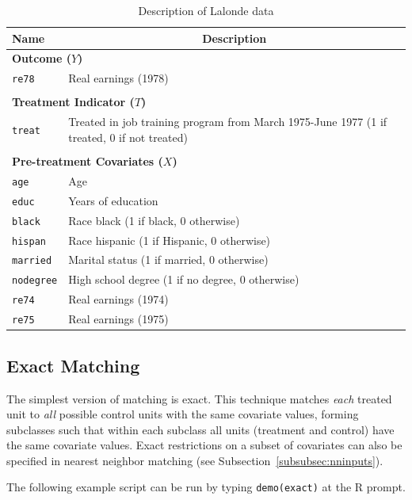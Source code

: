 \documentclass[oneside,letterpaper,titlepage]{article}
\begin{document}
\begin{table}[h]
\centering
\begin{tabular}{lp{3in}}
  \hline 
  \multicolumn{1}{l}{Name} & \multicolumn{1}{c}{Description} \\
  \hline
  \multicolumn{2}{l}{\textbf{Outcome ($Y$)}} \\ 
  \texttt{re78} & Real earnings (1978) \\\\
  \multicolumn{2}{l}{\textbf{Treatment Indicator ($T$)}} \\
  \texttt{treat} & Treated in job training program from March 1975-June
  1977 (1 if treated, 0 if not treated)
  \\ \\
  \multicolumn{2}{l}{\textbf{Pre-treatment Covariates ($X$)}} \\
  \texttt{age} & Age\\
  \texttt{educ} & Years of education \\
  \texttt{black} & Race black (1 if black, 0 otherwise) \\
  \texttt{hispan} & Race hispanic  (1 if Hispanic, 0 otherwise) \\
  \texttt{married} & Marital status (1 if married, 0 otherwise) \\
  \texttt{nodegree} & High school degree (1 if no degree, 0 otherwise)\\
  \texttt{re74} & Real earnings (1974) \\
  \texttt{re75} & Real earnings (1975) \\ 
  \hline
\end{tabular}\label{lalonde}
\caption{Description of Lalonde data \label{dwvars}}
\end{table}

\subsection{Exact Matching} 
\label{exactm}

The simplest version of matching is exact.  This technique matches
\emph{each} treated unit to \emph{all} possible control units with the
same covariate values, forming subclasses such that within each
subclass all units (treatment and control) have the same covariate
values.  Exact restrictions on a subset of covariates can also be
specified in nearest neighbor matching (see
Subsection~\ref{subsubsec:nninputs}).

The following example script can be run by typing {\tt demo(exact)} at
the R prompt.
\end{document}
